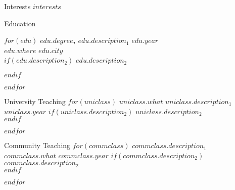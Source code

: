 \documentclass[$if(fontsize)$$fontsize$,$endif$$if(lang)$$babel-lang$,$endif$$if(papersize)$$papersize$paper,$endif$$for(classoption)$$classoption$$sep$,$endfor$]{$documentclass$}
\begin{document}
\begin{rSection}{Interests}
$interests$
\end{rSection}


\begin{rSection}{Education}

$for(edu)$
	\textbf{$edu.degree$, $edu.description_1$} \hfill $edu.year$\\ 
	$edu.where$ \hfill $edu.city$\\
    $if(edu.description_2)$ 
    \vspace{-0.7cm}
     $edu.description_2$ \vspace{0.3cm}

     $endif$ 

$endfor$

\end{rSection}


\begin{rSection}{University Teaching}
$for(uniclass)$
    \textbf{$uniclass.what$} $uniclass.description_1$ \hfill $uniclass.year$
    $if(uniclass.description_2)$ 
    \vspace{-0.30cm}
     $uniclass.description_2$\\
     $endif$
\vspace{-0.3cm}

$endfor$
\end{rSection}


\begin{rSection}{Community Teaching}
$for(commclass)$
    \textbf{$commclass.description_1$} $commclass.what$ \hfill $commclass.year$
    $if(commclass.description_2)$ 
    \vspace{-0.30cm}
     $commclass.description_2$\\
     $endif$
\vspace{-0.3cm}

$endfor$
\end{rSection}
\end{document}
